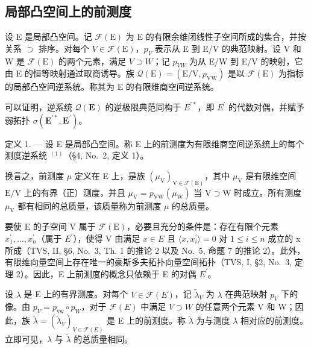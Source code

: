 \subsection{局部凸空间上的前测度}

设 E 是局部凸空间。记 \(\mathcal{F}(\mathrm{E})\) 为 E 的有限余维闭线性子空间所成的集合，并按关系 \(\supset\) 排序。对每个 \(V \in \mathcal{F}(\mathrm{E})\)，\(p_{V}\) 表示从 E 到 E/V 的典范映射。设 V 和 W 是 \(\mathcal{F}(\mathrm{E})\) 的两个元素，满足 \(V \supset W\)；记 \(p_{VW}\) 为从 E/W 到 E/V 的映射，它由 E 的恒等映射通过取商诱导。族 \(\mathcal{Q}(\mathrm{E}) = (\mathrm{E}/\mathrm{V}, p_{\mathrm{VW}})\) 是以 \(\mathcal{F}(\mathrm{E})\) 为指标的局部凸空间逆系统。称其为 E 的有限维商空间逆系统。

可以证明，逆系统 \(\mathcal{Q}(\mathbf{E})\) 的逆极限典范同构于 \(E^{\prime*}\)，即 \(E^{\prime}\) 的代数对偶，并赋予弱拓扑 \(\sigma(\mathbf{E}^{\prime*},\mathbf{E}^{\prime})\)。

定义 1. --- 设 E 是局部凸空间。称 E 上的前测度为有限维商空间逆系统上的每个测度逆系统 \(^{(1)}\)（§4, No.~2, 定义 1）。

换言之，前测度 \(\mu\) 定义在 E 上，是族 \((\mu_{\mathrm{V}})_{\mathrm{V}\in \mathcal{F}(\mathrm{E})}\)，其中 \(\mu_{\mathrm{V}}\) 是有限维空间 \(\mathrm{E / V}\) 上的有界（正）测度，并且 \(\mu_{\mathrm{V}} = p_{\mathrm{VW}}(\mu_{\mathrm{W}})\) 当 \(\mathrm{V}\supset \mathrm{W}\) 时成立。所有测度 \(\mu_{\mathrm{V}}\) 都有相同的总质量，该质量称为前测度 \(\mu\) 的总质量。

要使 E 的子空间 V 属于 \(\mathcal{F}(\mathrm{E})\)，必要且充分的条件是：存在有限个元素 \(x_{1}^{\prime},\ldots,x_{n}^{\prime}\)（属于 \(E^{\prime}\)），使得 V 由满足 \(x\in E\) 且 \(\langle x,x_{i}^{\prime}\rangle=0\) 对 \(1\leqslant i\leqslant n\) 成立的 x 所成（TVS, II, §6, No.~3, Th. 1 的推论 2 以及 No.~5, 命题 7 的推论 2）。此外，有限维向量空间上存在唯一的豪斯多夫拓扑向量空间拓扑（TVS, I, §2, No.~3, 定理 2）。因此，E 上前测度的概念只依赖于 E 的对偶 \(E^{\prime}\)。

设 \(\lambda\) 是 E 上的有界测度。对每个 \(V \in \mathcal{F}(E)\)，记 \(\widetilde{\lambda}_{V}\) 为 \(\lambda\) 在典范映射 \(p_{V}\) 下的像。由 \(p_{V} = p_{\mathrm{vw}} \circ p_{W}\)，对于 \(\mathcal{F}(E)\) 中满足 \(V \supset W\) 的任意两个元素 V 和 W；因此，族 \(\widetilde{\lambda} = (\widetilde{\lambda}_{V})_{V \in \mathcal{F}(E)}\) 是 E 上的前测度。称 \(\widetilde{\lambda}\) 为与测度 \(\lambda\) 相对应的前测度。立即可见，\(\lambda\) 与 \(\widetilde{\lambda}\) 的总质量相同。

